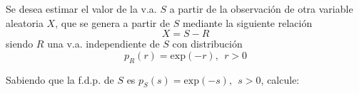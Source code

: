 \ifspanish

\question[25] %

Se desea estimar el valor de la v.a. $S$ a partir de la observación de otra variable aleatoria $X$, que se genera a partir de $S$ mediante la siguiente relación
$$X = S -R $$
siendo $R$ una v.a. independiente de $S$ con distribución
$$p_R(r) = \text{exp}(-r), ~~r>0$$
Sabiendo que la f.d.p. de $S$ es $p_S(s) = \text{exp}(-s), ~~s>0$, calcule:

